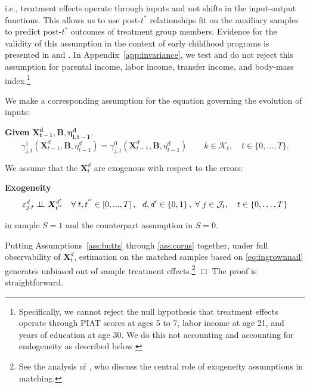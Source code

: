 \noindent i.e., treatment effects operate through inputs and not shifts in the input-output functions. This allows us to use post-$t^*$ relationships fit on the auxiliary samples to predict post-$t^*$ outcomes of treatment group members. Evidence for the validity of this assumption in the context of early childhood programs is presented in \citet{Heckman_Pinto_etal_2013_PerryFactor} and \citet{Attanasio-etal_2015_NBER_Estimating-Production}. In Appendix~\ref{app:invariance}, we test and do not reject this assumption for parental income, labor income, transfer income, and body-mass index.\footnote{Specifically, we cannot reject the null hypothesis that treatment effects operate through PIAT scores at ages 5 to 7, labor income at age 21, and years of education at age 30. We do this not accounting and accounting for endogeneity as described below.}

We make a corresponding assumption for the equation governing the evolution of inputs:

\addtocounter{assumption}{-1}
\renewcommand\theassumption{A--\arabic{assumption}(b)}
\onehalfspacing
\begin{assumption}\label{ass:psoriasis}
\textbf{Given} $\bm{X^d_{t-1}}, \bm{B}, \bm{\eta^d_{l,{t-1}}}$,
\begin{equation*}
\gamma^1_{j,t} (\bm{X}^d_{t-1}, \bm{B}, \eta^d_{t-1}) = \gamma^0_{j,t} (\bm{X}^d_{t-1}, \bm{B}, \eta^d_{t-1}) \qquad k \in \mathcal{K}_t, \quad t \in \{0,\dots,T\}.
\end{equation*}
\end{assumption}
\doublespacing
We assume that the $\bm{X}^d_t$ are exogenous with respect to the errors:

\renewcommand\theassumption{A--\arabic{assumption}}
\onehalfspacing
\begin{assumption}\label{ass:corns} \textbf{Exogeneity}
\begin{equation*}
\varepsilon^d_{j,t} \perp\!\!\!\perp \bm{X}^{d^{\prime}}_{t^{''}} \quad \forall \; t,t^{''} \in \left[ 0,...,T \right], \ \ d,d^{\prime} \in \left\{ 0,1 \right\}, \; \forall \  j \in \mathcal{J}_t, \quad t \in \left\{0,\dots,T\right\}
\end{equation*}
\end{assumption}
\doublespacing
\noindent in sample $S=1$ and the counterpart assumption in $S=0$.

\onehalfspacing
\begin{theorem}
Putting Assumptions~\ref{ass:butts} through \ref{ass:corns} together, under full observability of $\bm{X}^d_t$, estimation on the matched samples based on \eqref{eq:ingrownnail} generates unbiased out of sample treatment effects.\footnote{See the analysis of \citet{Heckman_Navarro_2004_REStat}, who discuss the central role of exogeneity assumptions in matching.} $\Box$ The proof is straightforward.
\end{theorem}
\doublespacing

